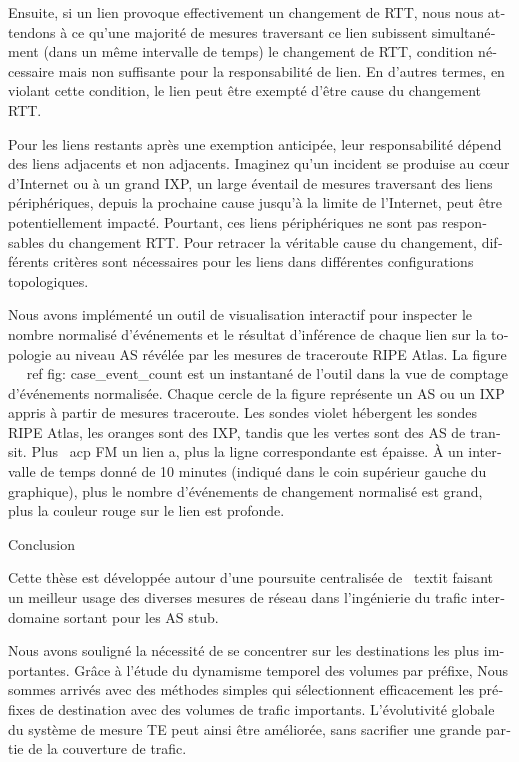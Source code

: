 \begin{otherlanguage}{french}
{{Ensuite, si un lien provoque effectivement un changement de RTT, nous nous attendons à ce qu'une majorité de mesures traversant ce lien subissent simultanément (dans un même intervalle de temps) le changement de RTT, condition nécessaire mais non suffisante pour la responsabilité de lien. En d'autres termes, en violant cette condition, le lien peut être exempté d'être cause du changement RTT.

Pour les liens restants après une exemption anticipée, leur responsabilité dépend des liens adjacents et non adjacents. Imaginez qu'un incident se produise au cœur d'Internet ou à un grand IXP, un large éventail de mesures traversant des liens périphériques, depuis la prochaine cause jusqu'à la limite de l'Internet, peut être potentiellement impacté. Pourtant, ces liens périphériques ne sont pas responsables du changement RTT.
Pour retracer la véritable cause du changement, différents critères sont nécessaires pour les liens dans différentes configurations topologiques.

Nous avons implémenté un outil de visualisation interactif pour inspecter le nombre normalisé d'événements et le résultat d'inférence de chaque lien sur la topologie au niveau AS révélée par les mesures de traceroute RIPE Atlas.
La figure ~ \ ref {fig: case_event_count} est un instantané de l'outil dans la vue de comptage d'événements normalisée.
Chaque cercle de la figure représente un AS ou un IXP appris à partir de mesures traceroute. Les sondes violet hébergent les sondes RIPE Atlas, les oranges sont des IXP, tandis que les vertes sont des AS de transit. Plus \ acp {FM} un lien a, plus la ligne correspondante est épaisse. À un intervalle de temps donné de 10 minutes (indiqué dans le coin supérieur gauche du graphique), plus le nombre d'événements de changement normalisé est grand, plus la couleur rouge sur le lien est profonde.

Conclusion

Cette thèse est développée autour d'une poursuite centralisée de \ textit {faisant un meilleur usage des diverses mesures de réseau dans l'ingénierie du trafic interdomaine sortant pour les AS stub}.

Nous avons souligné la nécessité de se concentrer sur les destinations les plus importantes.
Grâce à l'étude du dynamisme temporel des volumes par préfixe,
Nous sommes arrivés avec des méthodes simples qui sélectionnent efficacement les préfixes de destination avec des volumes de trafic importants.
L'évolutivité globale du système de mesure TE peut ainsi être améliorée, sans sacrifier une grande partie de la couverture de trafic.

}}
\end{otherlanguage}

